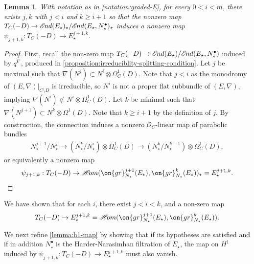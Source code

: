 \documentclass[12 pt]{amsart}
\theoremstyle{plain}
\newtheorem{lemma}[subsubsection]{Lemma}
\theoremstyle{definition}
\theoremstyle{remark}
\numberwithin{equation}{section}
\newcommand*{\sheafhom}{\mathscr{H}\kern -2pt om}
\newcommand*{\sheafend}{\mathscr{E}\kern -1pt nd}
\begin{document}
\begin{lemma}
	\label{lemma:nonzero-induced-connection}
	With notation as in \autoref{notation:graded-E},
	for every $0 < i < m$, there exists $j,k$ with $j < i$ and $k \geq
	i + 1$ so that the nonzero map $T_C(-D)\to
	\sheafend(E_\star)_\star/\sheafend(E_\star, N^\bullet_\star)_\star$ induces a nonzero map
$\psi_{j+1, k}: T_C(-D)\to E_\star^{j+1,k}$.
\end{lemma}
\begin{proof}
	First, recall the non-zero map
$T_C(-D)\to
\sheafend(E_\star)/\sheafend(E_\star,N_\star^\bullet)$ induced by $q^\nabla$, produced  in
	\autoref{proposition:irreduciblity-splitting-condition}.
Let $j$ be maximal such that $\nabla(N^j)\subset N^i\otimes \Omega^1_C(D)$. 
Note that $j< i$ as the monodromy of $(E,\nabla)|_{C\setminus D}$ is irreducible, so $N^i$ is
not a proper flat subbundle of $(E, \nabla)$, implying $\nabla(N^i) \not \subset
N^i\otimes \Omega^1_C(D)$.
Let $k$ be minimal such that $\nabla(N^{j+1})\subset N^k\otimes\Omega^1(D)$. 
Note that $k\geq i+1$ by the definition of $j$. 
By construction, the connection induces a nonzero $\mathscr{O}_C$-linear map of parabolic bundles
\begin{align*}
	N_\star^{j+1}/N_\star^j  \to (N_\star^k/N_\star^{i}) \otimes
\Omega_C^1(D)\to (N_\star^k/N_\star^{k-1}) \otimes
\Omega_C^1(D), 
\end{align*}
or equivalently a nonzero map
\[\psi_{j+1, k}: T_C(-D) \to \sheafhom(\on{gr}^{j+1}_{N_\star}(E_\star),
\on{gr}^k_{N_\star}(E_\star))_\star = E_\star^{j+1,k}.\qedhere\]
\end{proof}

We have shown that for each $i$, there exist $j<i< k$, and a non-zero map $$T_C(-D)\to E_\star^{j+1,k} =
\sheafhom(\on{gr}^{j+1}_{N_\star}(E_\star),
\on{gr}^{k}_{N_\star}(E_\star)).$$ 

We next refine \autoref{lemma:h1-map} by showing that if its hypotheses are satisfied and if in addition $N_\star^\bullet$ is the Harder-Narasimhan filtration of $E_\star$, the  map on $H^1$ 
induced by 
$\psi_{j+1, k}: T_C(-D)\to E_\star^{j+1,k}$
must also vanish.
\end{document}
